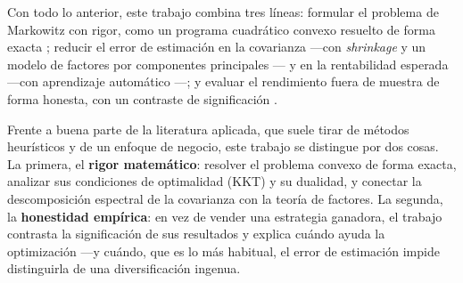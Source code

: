 Con todo lo anterior, este trabajo combina tres líneas: formular el problema de
Markowitz con rigor, como un programa cuadrático convexo resuelto de forma exacta
\cite{Markowitz1952, Boyd2004}; reducir el error de estimación en la covarianza
---con \textit{shrinkage} y un modelo de factores por componentes principales
\cite{Ledoit2004, Ross1976}--- y en la rentabilidad esperada ---con aprendizaje
automático \cite{Gu2020}---; y evaluar el rendimiento fuera de muestra de forma
honesta, con un contraste de significación \cite{DeMiguel2009, Memmel2003}.

Frente a buena parte de la literatura aplicada, que suele tirar de métodos
heurísticos y de un enfoque de negocio, este trabajo se distingue por dos cosas.
La primera, el \textbf{rigor matemático}: resolver el problema convexo de forma
exacta, analizar sus condiciones de optimalidad (KKT) y su dualidad, y conectar
la descomposición espectral de la covarianza con la teoría de factores. La
segunda, la \textbf{honestidad empírica}: en vez de vender una estrategia
ganadora, el trabajo contrasta la significación de sus resultados y explica
cuándo ayuda la optimización ---y cuándo, que es lo más habitual, el error de
estimación impide distinguirla de una diversificación ingenua.
